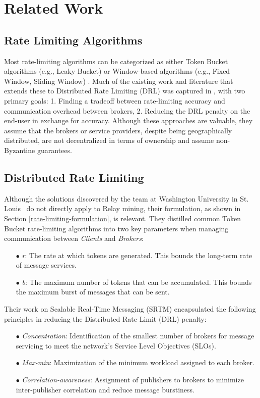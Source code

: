 \documentclass[runningheads]{llncs}
\begin{document}
\section{Related Work}

\subsection{Rate Limiting Algorithms}

Most rate-limiting algorithms can be categorized as either Token Bucket algorithms (e.g., Leaky Bucket) or Window-based algorithms (e.g., Fixed Window, Sliding Window) \cite{betterprogrammingRateLimit}. Much of the existing work and literature that extends these to Distributed Rate Limiting (DRL) was captured in \cite{wustl2021drl} \cite{calu2007drl}, with two primary goals: 1. Finding a tradeoff between rate-limiting accuracy and communication overhead between brokers, 2. Reducing the DRL penalty on the end-user in exchange for accuracy. Although these approaches are valuable, they assume that the brokers or service providers, despite being geographically distributed, are not decentralized in terms of ownership and assume non-Byzantine guarantees.

\subsection{Distributed Rate Limiting}

Although the solutions discovered by the team at Washington University in St. Louis~\cite{wustl2021drl} do not directly apply to Relay mining, their formulation, as shown in Section \ref{rate-limiting-formulation}, is relevant. They distilled common Token Bucket rate-limiting algorithms into two key parameters when managing communication between \textit{Clients} and \textit{Brokers}:

\begin{itemize}
    \item[$\bullet$] \textit{r}: The rate at which tokens are generated. This bounds the long-term rate of message services.
    \item[$\bullet$] \textit{b}: The maximum number of tokens that can be accumulated. This bounds the maximum burst of messages that can be sent.
\end{itemize}

Their work on Scalable Real-Time Messaging (SRTM) encapsulated the following principles in reducing the Distributed Rate Limit (DRL) penalty:
\begin{itemize}
    \item[$\bullet$] \textit{Concentration}: Identification of the smallest number of brokers for message servicing to meet the network's Service Level Objectives (SLOs).
    \item[$\bullet$] \textit{Max-min}: Maximization of the minimum workload assigned to each broker.
    \item[$\bullet$] \textit{Correlation-awareness}: Assignment of publishers to brokers to minimize inter-publisher correlation and reduce message burstiness.
\end{itemize}
\end{document}
